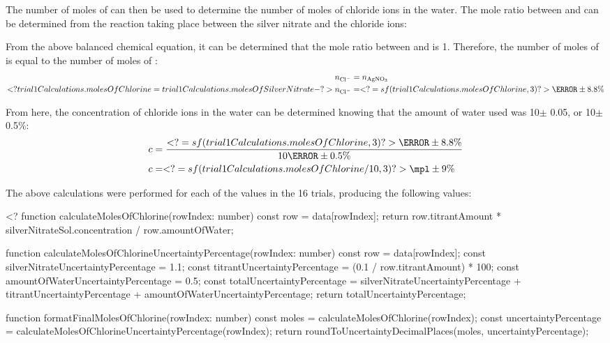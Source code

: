 \documentclass[11pt]{article}
\begin{document}
The number of moles of  can then be used to determine the number of moles of chloride ions in the water. The mole ratio between  and  can be determined from the reaction taking place between the silver nitrate and the chloride ions:

\centerline{}

From the above balanced chemical equation, it can be determined that the mole ratio between  and  is 1. Therefore, the number of moles of  is equal to the number of moles of :
%
\begin{align*}
	n_{\ce{Cl^-}} & = n_{\ce{AgNO3}}
	\\
	<? trial1Calculations.molesOfChlorine = trial1Calculations.molesOfSilverNitrate -?>
	n_{\ce{Cl^-}} & = <?= sf(trial1Calculations.molesOfChlorine, 3) ?>\mmol \pm 8.8\%
\end{align*}

From here, the concentration of chloride ions in the water can be determined knowing that the amount of water used was 10\ml $\pm$ 0.05\ml, or 10\ml $\pm$ 0.5\%:
%
\begin{align*}
	c & = \frac{<?= sf(trial1Calculations.molesOfChlorine, 3) ?>\mmol \pm 8.8\%}{10\mL \pm 0.5\%}
	\\
	c & = <?= sf(trial1Calculations.molesOfChlorine / 10, 3) ?>\mpl \pm 9\%
\end{align*}

The above calculations were performed for each of the values in the 16 trials, producing the following values:

<?
function calculateMolesOfChlorine(rowIndex: number) {
	const row = data[rowIndex];
	return row.titrantAmount * silverNitrateSol.concentration / row.amountOfWater;
}

function calculateMolesOfChlorineUncertaintyPercentage(rowIndex: number) {
	const row = data[rowIndex];
	const silverNitrateUncertaintyPercentage = 1.1;
	const titrantUncertaintyPercentage = (0.1 / row.titrantAmount) * 100;
	const amountOfWaterUncertaintyPercentage = 0.5;
	const totalUncertaintyPercentage =
		silverNitrateUncertaintyPercentage +
		titrantUncertaintyPercentage +
		amountOfWaterUncertaintyPercentage;
	return totalUncertaintyPercentage;
}

function formatFinalMolesOfChlorine(rowIndex: number) {
	const moles = calculateMolesOfChlorine(rowIndex);
	const uncertaintyPercentage = calculateMolesOfChlorineUncertaintyPercentage(rowIndex);
	return roundToUncertaintyDecimalPlaces(moles, uncertaintyPercentage);
}
\end{document}
